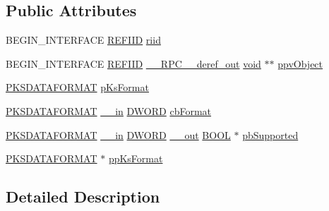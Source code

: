 \subsection*{Public Attributes}
\begin{DoxyCompactItemize}
\item 
B\+E\+G\+I\+N\+\_\+\+I\+N\+T\+E\+R\+F\+A\+CE \hyperlink{px__win__ds_8c_a80ec49c8ae61e234197d5071d2df497d}{R\+E\+F\+I\+ID} \hyperlink{struct_i_ks_format_support_vtbl_aba34ed4b195d91294b0de6f60b7af611}{riid}
\item 
B\+E\+G\+I\+N\+\_\+\+I\+N\+T\+E\+R\+F\+A\+CE \hyperlink{px__win__ds_8c_a80ec49c8ae61e234197d5071d2df497d}{R\+E\+F\+I\+ID} \hyperlink{rpcsal_8h_a23bc188526f10656f9c79d950f6c3192}{\+\_\+\+\_\+\+R\+P\+C\+\_\+\+\_\+deref\+\_\+out} \hyperlink{sound_8c_ae35f5844602719cf66324f4de2a658b3}{void} $\ast$$\ast$ \hyperlink{struct_i_ks_format_support_vtbl_a93ed121c067c07dbcbb57c1b4e561229}{ppv\+Object}
\item 
\hyperlink{ks_8h_acaab42d86ef5ccbd368f0b9692f01b9d}{P\+K\+S\+D\+A\+T\+A\+F\+O\+R\+M\+AT} \hyperlink{struct_i_ks_format_support_vtbl_a640d33f8f91ba33767ec8e6b6260e6b9}{p\+Ks\+Format}
\item 
\hyperlink{ks_8h_acaab42d86ef5ccbd368f0b9692f01b9d}{P\+K\+S\+D\+A\+T\+A\+F\+O\+R\+M\+AT} \hyperlink{sal_8h_a3f6b8655e1aa9dfc15a9029f0343009e}{\+\_\+\+\_\+in} \hyperlink{mapinls_8h_ad342ac907eb044443153a22f964bf0af}{D\+W\+O\+RD} \hyperlink{struct_i_ks_format_support_vtbl_a5f4f0d8c43069d4bc3df1ef90afd2a52}{cb\+Format}
\item 
\hyperlink{ks_8h_acaab42d86ef5ccbd368f0b9692f01b9d}{P\+K\+S\+D\+A\+T\+A\+F\+O\+R\+M\+AT} \hyperlink{sal_8h_a3f6b8655e1aa9dfc15a9029f0343009e}{\+\_\+\+\_\+in} \hyperlink{mapinls_8h_ad342ac907eb044443153a22f964bf0af}{D\+W\+O\+RD} \hyperlink{sal_8h_abb4c3c1135aab6c47cff22e7c16efb74}{\+\_\+\+\_\+out} \hyperlink{nfilterkit_8h_a3be13892ae7076009afcf121347dd319}{B\+O\+OL} $\ast$ \hyperlink{struct_i_ks_format_support_vtbl_af67651ffc8672c13eb9b8c282a8a768c}{pb\+Supported}
\item 
\hyperlink{ks_8h_acaab42d86ef5ccbd368f0b9692f01b9d}{P\+K\+S\+D\+A\+T\+A\+F\+O\+R\+M\+AT} $\ast$ \hyperlink{struct_i_ks_format_support_vtbl_a1c7baa3ee1432c713cc337514f4482e8}{pp\+Ks\+Format}
\end{DoxyCompactItemize}


\subsection{Detailed Description}


